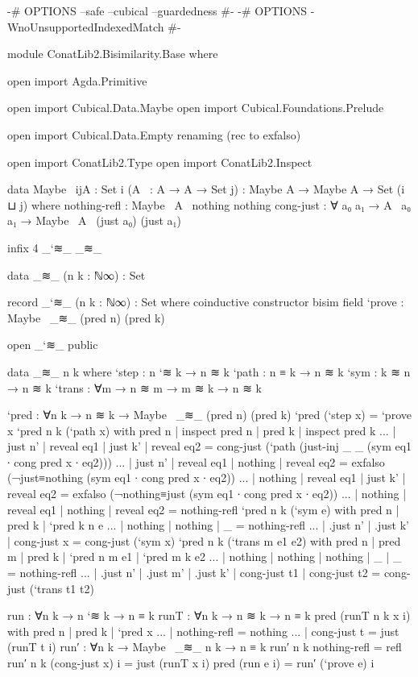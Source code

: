 \begin{code}
{-# OPTIONS --safe --cubical --guardedness #-}
{-# OPTIONS -WnoUnsupportedIndexedMatch #-}

module ConatLib2.Bisimilarity.Base where

open import Agda.Primitive

open import Cubical.Data.Maybe
open import Cubical.Foundations.Prelude

open import Cubical.Data.Empty
  renaming (rec to exfalso)

open import ConatLib2.Type
open import ConatLib2.Inspect

data Maybe~ {i}{j}{A : Set i} (A~ : A → A → Set j) : Maybe A → Maybe A → Set (i ⊔ j) where
  nothing-refl : Maybe~ A~ nothing nothing
  cong-just : ∀ {a₀ a₁} → A~ a₀ a₁ → Maybe~ A~ (just a₀) (just a₁)

infix 4 _`≋_ _≋_

data _≋_ (n k : ℕ∞) : Set

record _`≋_ (n k : ℕ∞) : Set where
  coinductive
  constructor bisim
  field
    `prove : Maybe~ _≋_ (pred n) (pred k)

open _`≋_ public

data _≋_ n k where
  `step  : n `≋ k → n ≋ k
  `path  : n ≡ k → n ≋ k
  `sym   : k ≋ n → n ≋ k
  `trans : ∀{m} → n ≋ m → m ≋ k → n ≋ k

`pred : ∀{n k} → n ≋ k → Maybe~ _≋_ (pred n) (pred k)
`pred (`step x) = `prove x
`pred {n} {k} (`path x) with pred n | inspect pred n | pred k | inspect pred k
... | just n' | reveal eq1 | just k' | reveal eq2 = cong-just (`path (just-inj _ _ (sym eq1 ∙ cong pred x ∙ eq2)))
... | just n' | reveal eq1 | nothing | reveal eq2 = exfalso (¬just≡nothing (sym eq1 ∙ cong pred x ∙ eq2))
... | nothing | reveal eq1 | just k' | reveal eq2 = exfalso (¬nothing≡just (sym eq1 ∙ cong pred x ∙ eq2))
... | nothing | reveal eq1 | nothing | reveal eq2 = nothing-refl
`pred {n} {k} (`sym e) with pred n | pred k | `pred {k} {n} e
... | nothing  | nothing  | _ = nothing-refl
... | .just n' | .just k' | cong-just x = cong-just (`sym x)
`pred {n} {k} (`trans {m} e1 e2) with pred n | pred m | pred k | `pred {n} {m} e1 | `pred {m} {k} e2
... | nothing  | nothing  | nothing  | _  | _  = nothing-refl
... | .just n' | .just m' | .just k' | cong-just t1 | cong-just t2 = cong-just (`trans t1 t2)

run : ∀{n k} → n `≋ k → n ≡ k
runT : ∀{n k} → n ≋ k → n ≡ k
pred (runT {n} {k} x i) with {pred n} | {pred k} | `pred x
... | nothing-refl = nothing
... | cong-just t = just (runT t i)
run′ : ∀{n k} → Maybe~ _≋_ n k → n ≡ k
run′ {n} {k} nothing-refl = refl
run′ {n} {k} (cong-just x) i = just (runT x i)
pred (run e i) = run′ (`prove e) i


\end{code}

